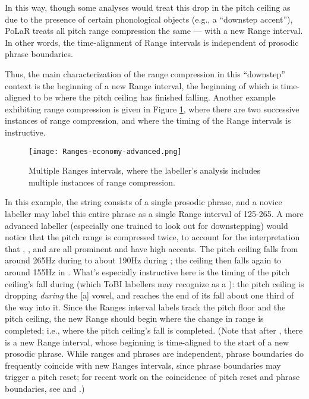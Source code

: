 In this way, though some analyses would treat this drop in the pitch ceiling as due to the presence of certain phonological objects (e.g., a “downstep accent”), PoLaR treats all pitch range compression the same — with a new Range interval. In other words, the time-alignment of Range intervals is independent of prosodic phrase boundaries.

Thus, the main characterization of the range compression in this “downstep” context is the beginning of a new Range interval, the beginning of which is time-aligned to be where the pitch ceiling has finished falling. Another example exhibiting range compression is given in Figure \ref{fig:economy Ranges Adv}, where there are two successive instances of range compression, and where the timing of the Range intervals is instructive.

\begin{figure}[H]
\centering
%
\texttt{[image: Ranges-economy-advanced.png]}
%
\caption{Multiple Ranges intervals, where the labeller’s analysis includes multiple instances of range compression.%
\label{fig:economy Ranges Adv}%
}
\end{figure}

In this example, the string  consists of a single prosodic phrase, and a novice labeller may label this entire phrase as a single Range interval of 125-265. A more advanced labeller (especially one trained to look out for downstepping) would notice that the pitch range is compressed twice, to account for the interpretation that , , and  are all prominent and have high accents. The pitch ceiling falls from around 265Hz during  to about 190Hz during ; the ceiling then falls again to around 155Hz in . What’s especially instructive here is the timing of the pitch ceiling’s fall during  (which ToBI labellers may recognize as a ): the pitch ceiling is dropping \textit{during} the [a] vowel, and reaches the end of its fall about one third of the way into it. Since the Ranges interval labels track the pitch floor and the pitch ceiling, the new Range should begin where the change in range is completed; i.e., where the pitch ceiling’s fall is completed. (Note that after , there is a new Range interval, whose beginning is time-aligned to the start of a new prosodic phrase. While ranges and phrases are independent, phrase boundaries do frequently coincide with new Ranges intervals, since phrase boundaries may trigger a pitch reset; for recent work on the coincidence of pitch reset and phrase boundaries, see \citealt{brugos15} and \citealt{kim20}.)

